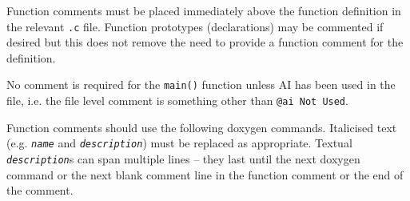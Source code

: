 \documentclass{article}
\begin{document}
Function comments must be placed immediately above the function definition in the relevant \texttt{.c} file. Function prototypes (declarations) may be commented if desired but this does not remove the need to provide a function comment for the definition. 

No comment is required for the \texttt{main()} function unless AI has been used in the file, i.e. the file level comment is something other than \texttt{@ai Not Used}.

Function comments should use the following doxygen commands. Italicised text (e.g. \texttt{\textit{name}} and \texttt{\textit{description}}) must be replaced as appropriate. Textual \texttt{\textit{description}}s can span multiple lines -- they last until the next doxygen command or the next blank comment line in the function comment or the end of the comment. 
\end{document}
